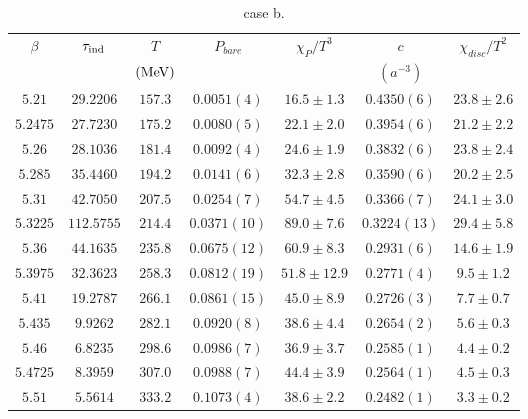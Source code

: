 \begin{table}
\begin{center}
\begin{tabular}{c|c|c|c|c|c|c}
    \hline    
 $\beta$ & $\tau_{\rm ind}$ & $T$ & $P_{bare}$ & $\chi _P/T^3$ & $c$ & $\chi_{disc}/T^2$ \\
   & & $({\rm MeV})$ & & & $(a^{-3})$ & \\
\hline
 $5.21$ & $29.2206$ & $157.3$ & $0.0051(4)$ & $16.5\pm 1.3$ & $0.4350(6)$ & $23.8\pm 2.6$ \\
\hline
 $5.2475$ & $27.7230$ & $175.2$ & $0.0080(5)$ & $22.1\pm 2.0$ & $0.3954(6)$ & $21.2\pm 2.2$ \\
\hline
 $5.26$ & $28.1036$ & $181.4$ & $0.0092(4)$ & $24.6\pm 1.9$ & $0.3832(6)$ & $23.8\pm 2.4$ \\
\hline
 $5.285$ & $35.4460$ & $194.2$ & $0.0141(6)$ & $32.3\pm 2.8$ & $0.3590(6)$ & $20.2\pm 2.5$ \\
\hline
 $5.31$ & $42.7050$ & $207.5$ & $0.0254(7)$ & $54.7\pm 4.5$ & $0.3366(7)$ & $24.1\pm 3.0$ \\
\hline
\textcolor[rgb]{1,0,0}{$5.3225$} & $112.5755$ & $214.4$ & $0.0371(10)$ & \textcolor[rgb]{1,0,0}{$89.0\pm 7.6$} & $0.3224(13)$ & \textcolor[rgb]{1,0,0}{$29.4\pm 5.8$} \\
\hline
 $5.36$ & $44.1635$ & $235.8$ & $0.0675(12)$ & $60.9\pm 8.3$ & $0.2931(6)$ & $14.6\pm 1.9$ \\
\hline
 $5.3975$ & $32.3623$ & $258.3$ & $0.0812(19)$ & $51.8\pm 12.9$ & $0.2771(4)$ & $9.5\pm 1.2$ \\
\hline
 $5.41$ & $19.2787$ & $266.1$ & $0.0861(15)$ & $45.0\pm 8.9$ & $0.2726(3)$ & $7.7\pm 0.7$ \\
\hline
 $5.435$ & $9.9262$ & $282.1$ & $0.0920(8)$ & $38.6\pm 4.4$ & $0.2654(2)$ & $5.6\pm 0.3$ \\
\hline
 $5.46$ & $6.8235$ & $298.6$ & $0.0986(7)$ & $36.9\pm 3.7$ & $0.2585(1)$ & $4.4\pm 0.2$ \\
\hline
 $5.4725$ & $8.3959$ & $307.0$ & $0.0988(7)$ & $44.4\pm 3.9$ & $0.2564(1)$ & $4.5\pm 0.3$ \\
\hline
 $5.51$ & $5.5614$ & $333.2$ & $0.1073(4)$ & $38.6\pm 2.2$ & $0.2482(1)$ & $3.3\pm 0.2$ \\
\hline
\end{tabular}
\end{center}
\caption{\label{tab.res.staggeredam1res2}case b.}
\end{table}

